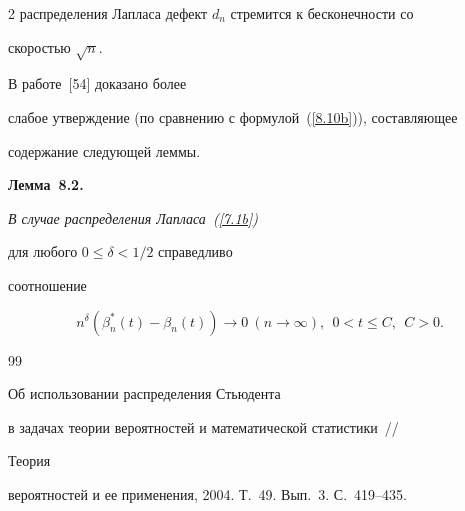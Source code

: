 \begin{multicols}{2}
распределения Лапласа дефект $d_n$ стремится к бесконечности со


скоростью $\sqrt n$.





В  работе~[54] доказано более


слабое утверждение (по сравнению с формулой~(\ref{8.10b})), составляющее


содержание следующей леммы.





\medskip





\noindent


{\bf Лемма~8.2.} {\it В случае распределения Лапласа~(\ref{7.1b})


для любого $0\le\delta<1/2$ справедливо


соотношение}


\begin{equation*}


n^{\delta}(\beta_n^*(t)-\beta_n(t))\to 0\  (n\to\infty),\ \ 


 0<t\le C, \ \  C>0.


\end{equation*}








{\small\frenchspacing


{%




\begin{thebibliography}{99}









Об использовании распределения Стьюдента


в задачах теории вероятностей и математической статистики~//


Теория


вероятностей и ее применения, 2004. Т.~49. Вып.~3. С.~419--435.










\end{thebibliography}}}
\end{multicols}
